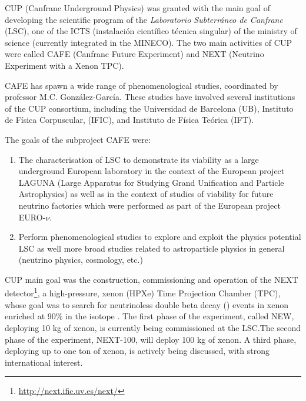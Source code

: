 CUP (Canfranc Underground Physics) was granted with the main goal of developing the scientific program of the
 \emph{Laboratorio Subterr\'aneo de Canfranc} (LSC), one of the ICTS (instalaci\'on cient\'ifico t\'ecnica singular) of the ministry of science (currently integrated in the MINECO). The two main activities of CUP were called
 CAFE (Canfranc Future Experiment) and NEXT (Neutrino Experiment with a Xenon TPC).

CAFE has spawn a wide range of phenomenological studies, coordinated by professor 
M.C. Gonz\'alez-Garc\'ia. These studies have involved several institutions of the CUP consortium, including the Universidad de Barcelona (UB), Instituto de F\'isica Corpuscular, (IFIC), and Instituto de F\'isica Te\'orica (IFT). 

The goals of the subproject CAFE were:
\begin{enumerate}
\item The characterisation of LSC to demonstrate its viability 
as a large underground European laboratory in the context of
the European project LAGUNA (Large Apparatus for Studying Grand
Unification and Particle Astrophysics) as well as in the context
of studies of viability for future neutrino factories which were
performed as part of the European project EURO-$\nu$.
\item Perform phenomenological studies to explore and exploit 
the physics potential LSC  as well more broad studies related
to astroparticle physics in general (neutrino physics, cosmology, etc.)
\end{enumerate}


%

CUP main goal was the construction, commissioning and operation of the NEXT detector\footnote{\url{http://next.ific.uv.es/next/}}, a high-pressure, xenon (HPXe) Time Projection Chamber (TPC), whose goal was to search for neutrinoless double beta decay  (\bbonu) events in xenon enriched at 90\% in the isotope \XE. The first phase of the experiment, called NEW, deploying 10 kg of xenon, is currently being commissioned at the LSC.The second phase of the experiment, NEXT-100, will deploy 100 kg of xenon. A third phase, deploying up to one ton of xenon, is actively being discussed, with strong international interest.
 
